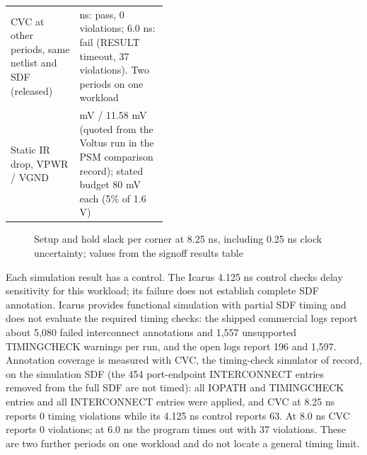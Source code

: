 \documentclass[11pt,letterpaper]{article}
\renewcommand{\_}{\textunderscore\penalty0\hskip0pt\relax}
\begin{document}
\begin{center}
\begin{tabularx}{\linewidth}{@{}>{\raggedright\arraybackslash}p{0.44\linewidth}>{\raggedright\arraybackslash}X@{}}
CVC at other periods, same netlist and SDF (released) & 8.0 ns: pass, 0 violations; 6.0 ns: fail (RESULT timeout, 37 violations). Two periods on one workload\\
Static IR drop, VPWR / VGND & 11.0 mV / 11.58 mV (quoted from the Voltus run in the PSM comparison record); stated budget 80 mV each (5\% of 1.6 V)\\
\bottomrule
\end{tabularx}
\end{center}

\begin{figure}[H]
\centering
{}
\caption*{Setup and hold slack per corner at 8.25 ns, including 0.25 ns clock uncertainty; values from the signoff results table}
\end{figure}

Each simulation result has a control. The Icarus 4.125 ns control checks delay sensitivity for this workload; its failure does not establish complete SDF annotation. Icarus provides functional simulation with partial SDF timing and does not evaluate the required timing checks: the shipped commercial logs report about 5,080 failed interconnect annotations and 1,557 unsupported TIMINGCHECK warnings per run, and the open logs report 196 and 1,597. Annotation coverage is measured with CVC, the timing-check simulator of record, on the simulation SDF (the 454 port-endpoint INTERCONNECT entries removed from the full SDF are not timed): all IOPATH and TIMINGCHECK entries and all INTERCONNECT entries were applied, and CVC at 8.25 ns reports 0 timing violations while its 4.125 ns control reports 63. At 8.0 ns CVC reports 0 violations; at 6.0 ns the program times out with 37 violations. These are two further periods on one workload and do not locate a general timing limit.
\end{document}
